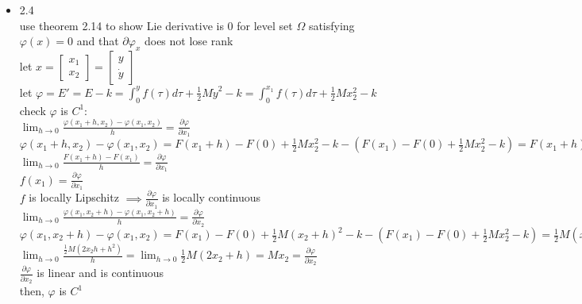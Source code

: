 \documentclass[12pt,letter]{article}
\begin{document}
\begin{itemize}
    \pagebreak  
  
  \item 2.4\\
    use theorem 2.14 to show Lie derivative is 0 for level set $\Omega$ satisfying $\varphi(x)=0$ and that $\partial \varphi_x$ does not lose rank\\
    
    let $x=\begin{bmatrix}x_1 \\ x_2 \end{bmatrix}=\begin{bmatrix}y \\ \dot{y} \end{bmatrix}$\\

    let $\varphi=E'=E-k=\int_{0}^y f(\tau) d \tau + \frac{1}{2}M \dot{y}^2-k=\int_{0}^{x_1} f(\tau) d \tau + \frac{1}{2}M x_2^2-k$\\

    check $\varphi$ is $C^1$:\\
    
    $\lim_{h \to 0} \frac{\varphi(x_1+h,x_2)-\varphi(x_1,x_2)}{h}=\frac{ \partial \varphi}{\partial x_1}$\\
    $\varphi(x_1+h,x_2)-\varphi(x_1,x_2)=F(x_1+h)-F(0)+\frac{1}{2}M x_2^2-k-(F(x_1)-F(0)+\frac{1}{2}M x_2^2-k)=F(x_1+h)-F(x_1)$\\
    $\lim_{h \to 0}\frac{F(x_1+h)-F(x_1)}{h}=\frac{ \partial \varphi}{\partial x_1}$\\
    $f(x_1)=\frac{ \partial \varphi}{\partial x_1}$\\
    $f$ is locally Lipschitz $\implies \frac{ \partial \varphi}{\partial x_1}$ is locally continuous\\
    
    $\lim_{h \to 0} \frac{\varphi(x_1,x_2+h)-\varphi(x_1,x_2+h)}{h}=\frac{ \partial \varphi}{\partial x_2}$\\
    $\varphi(x_1,x_2+h)-\varphi(x_1,x_2)=F(x_1)-F(0)+\frac{1}{2}M (x_2+h)^2-k-(F(x_1)-F(0)+\frac{1}{2}M x_2^2-k)=\frac{1}{2}M(x_2^2+2x_2h+h^2 - x_2^2)=\frac{1}{2}M(2x_2h+h^2)$\\
    $\lim_{h \to 0} \frac{\frac{1}{2}M(2x_2h+h^2)}{h}=\lim_{h \to 0} \frac{1}{2}M(2x_2+h)=Mx_2=\frac{ \partial \varphi}{\partial x_2}$\\
    $\frac{\partial \varphi}{\partial x_2}$ is linear and is continuous\\

    then, $\varphi$ is $C^1$\\
    

\end{itemize}
\end{document}
